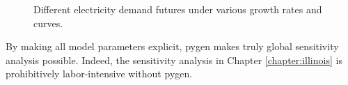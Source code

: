 \begin{figure}[H]
  \centering
  \resizebox{0.8\textwidth}{!}{}
  \caption{Different electricity demand futures under various growth rates and curves.}
  \label{fig:dem-growth}
\end{figure}

By making all model parameters explicit, \gls{pygen} makes truly global sensitivity
analysis possible. Indeed, the sensitivity analysis in Chapter \ref{chapter:illinois}
is prohibitively labor-intensive without \gls{pygen}.
